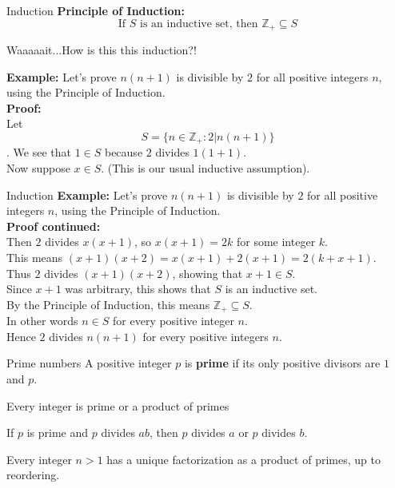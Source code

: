 \documentclass{beamer}
\begin{document}
\begin{frame}{Induction}
\textbf{Principle of Induction:}
$$\text{If $S$ is an inductive set, then $\mathbb{Z}_+\subseteq S$}$$
\pause
\begin{quest}
Waaaaait...How is this this induction?!
\end{quest}
\pause
\textbf{Example:} Let's prove $n(n+1)$ is divisible by $2$ for all positive integers $n$, using the Principle of Induction.\\
\pause
\textbf{Proof:}\\
\pause
Let
$$S = \{n\in\mathbb{Z}_+: 2 | n(n+1)\}$$.
\pause
We see that $1\in S$ because $2$ divides $1(1+1)$.\\
\pause
Now suppose $x\in S$.  (This is our usual inductive assumption).\\
\end{frame}
\begin{frame}{Induction}
\textbf{Example:} Let's prove $n(n+1)$ is divisible by $2$ for all positive integers $n$, using the Principle of Induction.\\
\textbf{Proof continued:}\\
\pause
Then $2$ divides $x(x+1)$, so $x(x+1) = 2k$ for some integer $k$.\\
\pause
This means $(x+1)(x+2) = x(x+1) + 2(x+1) = 2(k+x+1)$.\\
\pause
Thus $2$ divides $(x+1)(x+2)$, showing that $x+1\in S$.\\
\pause
Since $x+1$ was arbitrary, this shows that $S$ is an inductive set.\\
\pause
By the Principle of Induction, this means $\mathbb{Z}_+\subseteq S$.\\
\pause
In other words $n\in S$ for every positive integer $n$.\\
\pause
Hence $2$ divides $n(n+1)$ for every positive integers $n$.
\end{frame}


\begin{frame}{Prime numbers}
A positive integer $p$ is \textbf{prime} if its only positive divisors are $1$ and $p$.
\begin{thm}
Every integer is prime or a product of primes
\end{thm}
\begin{thm}
If $p$ is prime and $p$ divides $ab$, then $p$ divides $a$ or $p$ divides $b$.
\end{thm}
\begin{thm}
Every integer $n > 1$ has a unique factorization as a product of primes, up to reordering.
\end{thm}

\end{frame}
\end{document}
